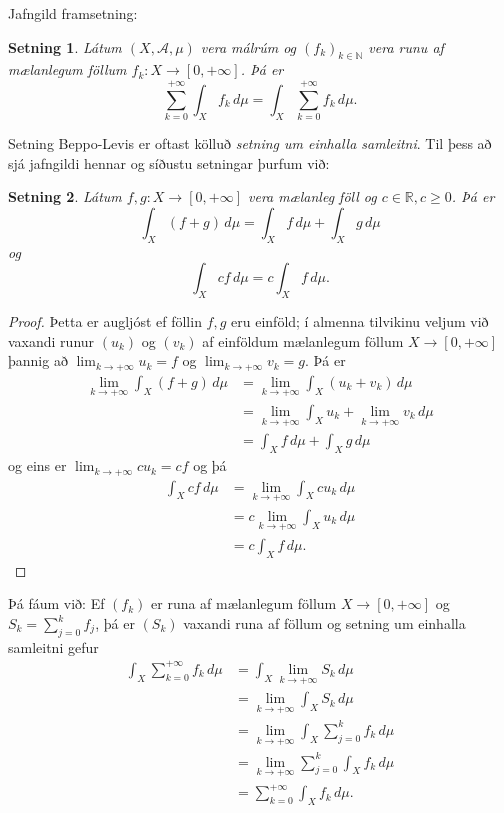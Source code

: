 \documentclass[a4paper,icelandic,11pt]{book}
\theoremstyle{plain}      \newtheorem{setn}{Setning}[chapter]
\theoremstyle{definition} \newtheorem{skilgr}[setn]{Skilgreining}
\theoremstyle{remark}     \newtheorem*{ath}{Athugasemd}
\newcommand{\R}{\mathbb R}
\newcommand{\N}{\mathbb N}
\begin{document}
Jafngild framsetning:
\begin{setn}
  Látum $(X,\mathcal A,\mu)$ vera málrúm og $(f_{k})_{k\in\N}$ vera
  runu af mælanlegum föllum $f_{k}:X\to[0,+\infty]$. Þá er
  \[
  \sum_{k=0}^{+\infty}\int_{X} f_{k}\,d\mu
  = \int_{X}\sum_{k=0}^{+\infty}f_{k}\,d\mu.
  \]
\end{setn}
Setning Beppo-Levis er oftast kölluð \emph{setning um einhalla
  samleitni}. Til þess að sjá jafngildi
hennar og síðustu setningar þurfum við:
\begin{setn}
  Látum $f,g:X\to[0,+\infty]$ vera mælanleg föll og $c\in\R,c\ge
  0$. Þá er
  \[
  \int_{X}(f+g)\,d\mu
  = \int_{X} f\,d\mu + \int_{X} g\,d\mu
  \]
  og
  \[
  \int_{X}cf\,d\mu
  = c\int_{X}f\,d\mu.
  \]
\end{setn}
\begin{proof}
  Þetta er augljóst ef föllin $f,g$ eru einföld; í almenna tilvikinu
  veljum við vaxandi runur $(u_{k})$ og $(v_{k})$ af einföldum
  mælanlegum föllum $X\to[0,+\infty]$ þannig að
  $\lim_{k\to+\infty}u_{k}=f$ og $\lim_{k\to+\infty}v_{k}=g$. Þá er
  \begin{align*}
    \lim_{k\to+\infty}\int_{X} (f+g)\,d\mu
    &= \lim_{k\to+\infty}\int_{X}(u_{k}+v_{k})\,d\mu
    \\
    &= \lim_{k\to+\infty}\int_{X}u_{k}+\lim_{k\to+\infty}v_{k}\,d\mu
    \\
    &= \int_{X}f\,d\mu + \int_{X}g\,d\mu
  \end{align*}
  og eins er $\lim_{k\to+\infty}cu_{k}=cf$ og þá
  \begin{align*}
    \int_{X}cf\,d\mu
    &= \lim_{k\to+\infty}\int_{X}cu_{k}\,d\mu \\
    &= c\lim_{k\to+\infty}\int_{X}u_{k}\,d\mu \\
    &= c\int_{X}f\,d\mu.
  \end{align*}
\end{proof}
Þá fáum við: Ef $(f_{k})$ er runa af mælanlegum föllum
$X\to[0,+\infty]$ og $S_{k}=\sum_{j=0}^{k}f_{j}$, þá er $(S_{k})$
vaxandi runa af föllum og setning um einhalla samleitni gefur
\begin{align*}
  \int_{X}\sum_{k=0}^{+\infty}f_{k}\,d\mu
  &= \int_{X}\lim_{k\to+\infty}S_{k}\,d\mu
  \\
  &= \lim_{k\to+\infty}\int_{X}S_{k}\,d\mu
  \\
  &= \lim_{k\to+\infty}\int_{X}\sum_{j=0}^{k}f_{k}\,d\mu
  \\
  &= \lim_{k\to+\infty}\sum_{j=0}^{k}\int_{X}f_{k}\,d\mu
  \\
  &= \sum_{k=0}^{+\infty}\int_{X}f_{k}\,d\mu.
\end{align*}
\end{document}

